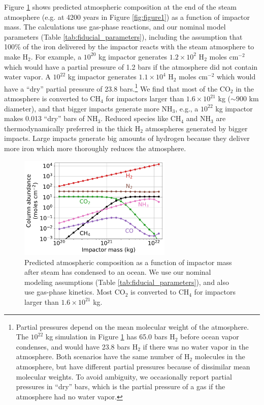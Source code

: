 Figure \ref{fig:figure2} shows predicted atmospheric composition at the end of the steam atmosphere (e.g. at 4200 years in Figure \ref{fig:figure1}) as a function of impactor mass. The calculations use gas-phase reactions, and our nominal model parameters (Table \ref{tab:fiducial_parameters}), including the assumption that 100\% of the iron delivered by the impactor reacts with the steam atmosphere to make H$_2$. For example, a $10^{20}$ kg impactor generates $1.2 \times 10^{2}$ H$_2$ moles cm$^{-2}$ which would have a partial pressure of 1.2 bars if the atmosphere did not contain water vapor. A $10^{22}$ kg impactor generates $1.1 \times 10^{4}$ H$_2$ moles cm$^{-2}$ which would have a ``dry'' partial pressure of 23.8 bars.\footnote{Partial pressures depend on the mean molecular weight of the atmosphere. The $10^{22}$ kg simulation in Figure \ref{fig:figure2} has 65.0 bars H$_2$ before ocean vapor condenses, and would have 23.8 bars H$_2$ if there was no water vapor in the atmosphere. Both scenarios have the same number of H$_2$ molecules in the atmosphere, but have different partial pressures because of dissimilar mean molecular weights. To avoid ambiguity, we occasionally report partial pressures in ``dry'' bars, which is the partial pressure of a gas if the atmosphere had no water vapor.}
We find that most of the CO$_2$ in the atmosphere is converted to CH$_4$ for impactors larger than $1.6 \times 10^{21}$ kg ($\sim 900$ km diameter), and that bigger impacts generate more NH$_3$, e.g., a $10^{22}$ kg impactor makes 0.013 ``dry'' bars of NH$_3$. Reduced species like CH$_4$ and NH$_3$ are thermodynamically preferred in the thick H$_2$ atmospheres generated by bigger impacts. Large impacts generate big amounts of hydrogen because they deliver more iron which more thoroughly reduces the atmosphere.

\begin{figure}
  \centering
  \includegraphics[width=0.65\textwidth]{tex/5impacts/figures/Figure2.pdf}
  \caption{Predicted atmospheric composition as a function of impactor mass after steam has condensed to an ocean. We use our nominal modeling assumptions (Table \ref{tab:fiducial_parameters}), and also use gas-phase kinetics. Most CO$_2$ is converted to CH$_4$ for impactors larger than $1.6 \times 10^{21}$ kg.}
  \label{fig:figure2}
\end{figure}

